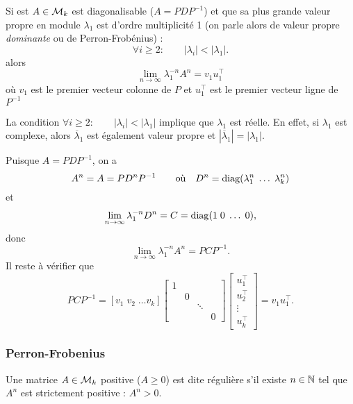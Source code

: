 \begin{proposition}
  Si est $A \in \mathcal{M}_k$ est diagonalisable ($A = P D P^{-1}$) et que sa plus grande valeur propre en module $\lambda_1$ est d'ordre multiplicité 1 (on parle alors de valeur propre {\em dominante} ou de Perron-Frobénius) :
  $$
  \forall i \geq 2: \qquad |\lambda_i| < |\lambda_1|.
  $$
  alors
  $$
  \lim_{n \to \infty} \lambda_1^{-n} A^n = v_1 u_1^\top
  $$
  où $v_1$ est le premier vecteur colonne de $P$ et $u_1^\top$ est le premier vecteur ligne de $P^{-1}$
\end{proposition}

\remark
La condition $\forall i \geq 2: \qquad |\lambda_i| < |\lambda_1|$ implique que $\lambda_1$ est réelle. En effet, si $\lambda_1$ est complexe, alors $\overline{\lambda}_1$ est également valeur propre et $|\overline{\lambda}_1| = |\lambda_1|$.

\proof
  Puisque $A = P D P^{-1}$, on a
  $$
  A^n = A = P D^n P^{-1}
  \qquad \text{où} \quad 
  D^n = \operatorname{diag}(\lambda_1^n \; \dots \; \lambda_k^n)
  $$
  et 
  $$
  \lim_{n \to \infty} \lambda_1^{-n} D^n = C = \operatorname{diag}(1 \; 0 \; \dots \; 0),
  $$
  donc
  $$
  \lim_{n \to \infty} \lambda_1^{-n} A^n = P C P^{-1}.
  $$
  Il reste à vérifier que
  $$
  P C P^{-1} 
  = \left[v_1 \; v_2 \; \dots v_k\right] 
  \left[\begin{array}{cccc} 1 & & & \\ & 0 & & \\ & & \ddots & \\ & & & 0 \end{array} \right] 
  \left[\begin{array}{c} u_1^\top \\ u_2^\top \\ \vdots \\ u_k^\top \end{array}\right] 
  = v_1 u_1^\top .
  $$
\eproof

\subsubsection{Perron-Frobenius}

\begin{definition}
  Une matrice $A \in \mathcal{M}_k$ positive ($A \geq 0$) est dite régulière s'il existe $n \in \mathbb{N}$ tel que $A^n$ est strictement positive : $A^n > 0$.
\end{definition}

